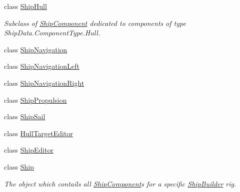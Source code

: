 \begin{DoxyCompactItemize}
class \hyperlink{class_skyrates_1_1_client_1_1_ship_1_1_ship_hull}{Ship\-Hull}
\begin{DoxyCompactList}\small\item\em Subclass of \hyperlink{class_skyrates_1_1_client_1_1_ship_1_1_ship_component}{Ship\-Component} dedicated to components of type Ship\-Data.\-Component\-Type.\-Hull. \end{DoxyCompactList}\item 
class \hyperlink{class_skyrates_1_1_client_1_1_ship_1_1_ship_navigation}{Ship\-Navigation}
\item 
class \hyperlink{class_skyrates_1_1_client_1_1_ship_1_1_ship_navigation_left}{Ship\-Navigation\-Left}
\item 
class \hyperlink{class_skyrates_1_1_client_1_1_ship_1_1_ship_navigation_right}{Ship\-Navigation\-Right}
\item 
class \hyperlink{class_skyrates_1_1_client_1_1_ship_1_1_ship_propulsion}{Ship\-Propulsion}
\item 
class \hyperlink{class_skyrates_1_1_client_1_1_ship_1_1_ship_sail}{Ship\-Sail}
\item 
class \hyperlink{class_skyrates_1_1_client_1_1_ship_1_1_hull_target_editor}{Hull\-Target\-Editor}
\item 
class \hyperlink{class_skyrates_1_1_client_1_1_ship_1_1_ship_editor}{Ship\-Editor}
\item 
class \hyperlink{class_skyrates_1_1_client_1_1_ship_1_1_ship}{Ship}
\begin{DoxyCompactList}\small\item\em The object which contails all \hyperlink{class_skyrates_1_1_client_1_1_ship_1_1_ship_component}{Ship\-Component}s for a specific \hyperlink{class_skyrates_1_1_client_1_1_ship_1_1_ship_builder}{Ship\-Builder} rig. \end{DoxyCompactList}\end{DoxyCompactItemize}
